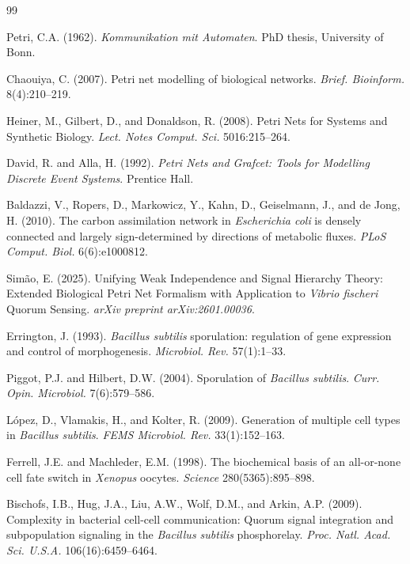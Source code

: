 \documentclass[twocolumn,11pt]{article}
\begin{document}

\begin{thebibliography}{99}
\setlength{\itemsep}{3pt}

Petri, C.A. (1962).
\newblock \textit{Kommunikation mit Automaten}.
\newblock PhD thesis, University of Bonn.

Chaouiya, C. (2007).
\newblock Petri net modelling of biological networks.
\newblock \textit{Brief. Bioinform.} 8(4):210--219.

Heiner, M., Gilbert, D., and Donaldson, R. (2008).
\newblock Petri Nets for Systems and Synthetic Biology.
\newblock \textit{Lect. Notes Comput. Sci.} 5016:215--264.

David, R. and Alla, H. (1992).
\newblock \textit{Petri Nets and Grafcet: Tools for Modelling Discrete Event Systems}.
\newblock Prentice Hall.

Baldazzi, V., Ropers, D., Markowicz, Y., Kahn, D., Geiselmann, J., and de Jong, H. (2010).
\newblock The carbon assimilation network in \textit{Escherichia coli} is densely connected and largely sign-determined by directions of metabolic fluxes.
\newblock \textit{PLoS Comput. Biol.} 6(6):e1000812.

Simão, E. (2025).
\newblock Unifying Weak Independence and Signal Hierarchy Theory: Extended Biological Petri Net Formalism with Application to \textit{Vibrio fischeri} Quorum Sensing.
\newblock \textit{arXiv preprint arXiv:2601.00036}.

Errington, J. (1993).
\newblock \textit{Bacillus subtilis} sporulation: regulation of gene expression and control of morphogenesis.
\newblock \textit{Microbiol. Rev.} 57(1):1--33.

Piggot, P.J. and Hilbert, D.W. (2004).
\newblock Sporulation of \textit{Bacillus subtilis}.
\newblock \textit{Curr. Opin. Microbiol.} 7(6):579--586.

López, D., Vlamakis, H., and Kolter, R. (2009).
\newblock Generation of multiple cell types in \textit{Bacillus subtilis}.
\newblock \textit{FEMS Microbiol. Rev.} 33(1):152--163.

Ferrell, J.E. and Machleder, E.M. (1998).
\newblock The biochemical basis of an all-or-none cell fate switch in \textit{Xenopus} oocytes.
\newblock \textit{Science} 280(5365):895--898.

Bischofs, I.B., Hug, J.A., Liu, A.W., Wolf, D.M., and Arkin, A.P. (2009).
\newblock Complexity in bacterial cell-cell communication: Quorum signal integration and subpopulation signaling in the \textit{Bacillus subtilis} phosphorelay.
\newblock \textit{Proc. Natl. Acad. Sci. U.S.A.} 106(16):6459--6464.


\end{thebibliography}
\end{document}
